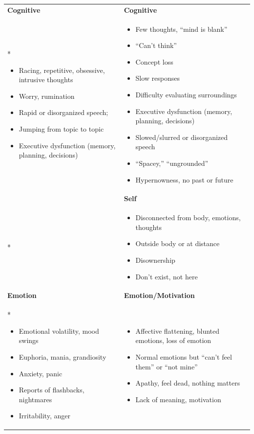 \documentclass[11pt,oneside]{book}
\newenvironment{compactitemize}
{\begin{itemize}[nosep, leftmargin=1em, itemsep=0pt, topsep=0pt]}
{\end{itemize}}
\begin{document}
\begin{longtable}{p{}|p{}}
\addlinespace[1em]
\textbf{Cognitive} & \textbf{Cognitive} \\*
\begin{compactitemize}
\item Racing, repetitive, obsessive, intrusive thoughts
\item Worry, rumination
\item Rapid or disorganized speech;
\item Jumping from topic to topic
\item Executive dysfunction (memory, planning, decisions)
\end{compactitemize}
&
\begin{compactitemize}
\item Few thoughts, \enquote{mind is blank}
\item \enquote{Can't think}
\item Concept loss
\item Slow responses
\item Difficulty evaluating surroundings
\item Executive dysfunction (memory, planning, decisions)
\item Slowed/slurred or disorganized speech
\item \enquote{Spacey,} \enquote{ungrounded}
\item Hypernowness, no past or future
\end{compactitemize} \\

\addlinespace[1em]
& \textbf{Self} \\*
&
\begin{compactitemize}
\item Disconnected from body, emotions, thoughts
\item Outside body or at distance
\item Disownership
\item Don't exist, not here
\end{compactitemize} \\

\addlinespace[1em]
\textbf{Emotion} & \textbf{Emotion/Motivation} \\*
\begin{compactitemize}
\item Emotional volatility, mood swings
\item Euphoria, mania, grandiosity
\item Anxiety, panic
\item Reports of flashbacks, nightmares
\item Irritability, anger
\end{compactitemize}
&
\begin{compactitemize}
\item Affective flattening, blunted emotions, loss of emotion
\item Normal emotions but \enquote{can't feel them} or \enquote{not mine}
\item Apathy, feel dead, nothing matters
\item Lack of meaning, motivation
\end{compactitemize} \\


\end{longtable}
\end{document}
